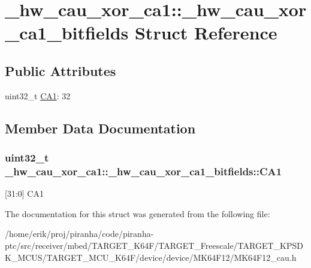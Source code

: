 \hypertarget{struct__hw__cau__xor__ca1_1_1__hw__cau__xor__ca1__bitfields}{}\section{\+\_\+hw\+\_\+cau\+\_\+xor\+\_\+ca1\+:\+:\+\_\+hw\+\_\+cau\+\_\+xor\+\_\+ca1\+\_\+bitfields Struct Reference}
\label{struct__hw__cau__xor__ca1_1_1__hw__cau__xor__ca1__bitfields}
\subsection*{Public Attributes}
\begin{DoxyCompactItemize}
\item 
uint32\+\_\+t \hyperlink{struct__hw__cau__xor__ca1_1_1__hw__cau__xor__ca1__bitfields_a5f089d1ed76788029a6f5142d952dfab}{C\+A1}\+: 32
\end{DoxyCompactItemize}


\subsection{Member Data Documentation}
\subsubsection[{\texorpdfstring{C\+A1}{CA1}}]{\setlength{\rightskip}{0pt plus 5cm}uint32\+\_\+t \+\_\+hw\+\_\+cau\+\_\+xor\+\_\+ca1\+::\+\_\+hw\+\_\+cau\+\_\+xor\+\_\+ca1\+\_\+bitfields\+::\+C\+A1}\hypertarget{struct__hw__cau__xor__ca1_1_1__hw__cau__xor__ca1__bitfields_a5f089d1ed76788029a6f5142d952dfab}{}\label{struct__hw__cau__xor__ca1_1_1__hw__cau__xor__ca1__bitfields_a5f089d1ed76788029a6f5142d952dfab}
\mbox{[}31\+:0\mbox{]} C\+A1 

The documentation for this struct was generated from the following file\+:\begin{DoxyCompactItemize}
\item 
/home/erik/proj/piranha/code/piranha-\/ptc/src/receiver/mbed/\+T\+A\+R\+G\+E\+T\+\_\+\+K64\+F/\+T\+A\+R\+G\+E\+T\+\_\+\+Freescale/\+T\+A\+R\+G\+E\+T\+\_\+\+K\+P\+S\+D\+K\+\_\+\+M\+C\+U\+S/\+T\+A\+R\+G\+E\+T\+\_\+\+M\+C\+U\+\_\+\+K64\+F/device/device/\+M\+K64\+F12/M\+K64\+F12\+\_\+cau.\+h\end{DoxyCompactItemize}
